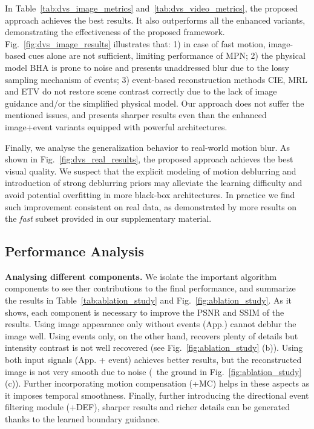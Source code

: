 \documentclass[10pt,twocolumn,letterpaper]{article}
\begin{document}
In Table~\ref{tab:dvs_image_metrics} and~\ref{tab:dvs_video_metrics}, the proposed approach achieves the best results. It also outperforms all the enhanced variants, demonstrating the effectiveness of the proposed framework. Fig.~\ref{fig:dvs_image_results} illustrates that: 1) in case of fast motion, image-based cues alone are not sufficient, limiting performance of MPN; 2) the physical model BHA is prone to noise and presents unaddressed blur due to the lossy sampling mechanism of events; 3) event-based reconstruction methods CIE, MRL and ETV do not restore scene contrast correctly due to the lack of image guidance and/or the simplified physical model. Our approach does not suffer the mentioned issues, and presents sharper results even than the enhanced image+event variants equipped with powerful architectures.



Finally, we analyse the generalization behavior to real-world motion blur. As shown in Fig.~\ref{fig:dvs_real_results}, the proposed approach achieves the best visual quality. We suspect that the explicit modeling of motion deblurring and introduction of strong deblurring priors may alleviate the learning difficulty and avoid potential overfitting in more black-box architectures. In practice we find such improvement consistent on real data, as demonstrated by more results on the \textit{fast} subset provided in our supplementary material. 



\subsection{Performance Analysis}
\textbf{Analysing different components.} We isolate the important algorithm components to see ther contributions to the final performance, and summarize the results in Table~\ref{tab:ablation_study} and Fig.~\ref{fig:ablation_study}. As it shows, each component is necessary to improve the PSNR and SSIM of the results. Using image appearance only without events (App.) cannot deblur the image well. Using events only, on the other hand, recovers plenty of details but intensity contrast is not well recovered (see Fig.~\ref{fig:ablation_study} (b)). Using both input signals (App. + event) achieves better results, but the reconstructed image is not very smooth due to noise (\eg~the ground in Fig.~\ref{fig:ablation_study} (c)). Further incorporating motion compensation (+MC) helps in these aspects as it imposes temporal smoothness. Finally, further introducing the directional event filtering module (+DEF), sharper results and richer details can be generated thanks to the learned boundary guidance.
\end{document}
